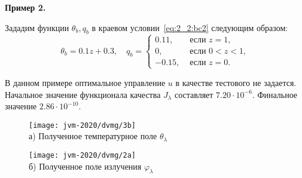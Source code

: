 \begin{frame}
    \textbf{Пример 2.}


    Зададим функции $\theta_{b}, q_{b}$ в краевом условии~\eqref{eq:2_2:bc2}
    следующим образом:
    \[
        \theta_{b}=0.1 z+0.3, \quad q_{b}=
        \begin{cases}
            0.11, & \text { если } z=1, \\
            0, & \text { если } 0<z<1, \\
            -0.15, & \text { если } z=0.
        \end{cases}
    \]

    В данном примере оптимальное управление $u$ в качестве тестового не задается.
    Начальное значение функционала качества $J_\lambda$ составляет $7.20 \cdot 10^{-6}$.
    Финальное значение $2.86 \cdot 10^{-10}$.

    \begin{figure}[h!t]
        \begin{minipage}[b][][b]{0.49\linewidth}
            \centering
            \texttt{[image: jvm-2020/dvmg/3b]}
            \\ а) Полученное температурное поле $\theta_\lambda$
        \end{minipage}
        \hfill
        \begin{minipage}[b][][b]{0.49\linewidth}
            \centering
            \texttt{[image: jvm-2020/dvmg/2a]}
            \\ б) Полученное поле излучения $\varphi_\lambda$
        \end{minipage}
        \label{fig:4_4:3}
    \end{figure}

\end{frame}
